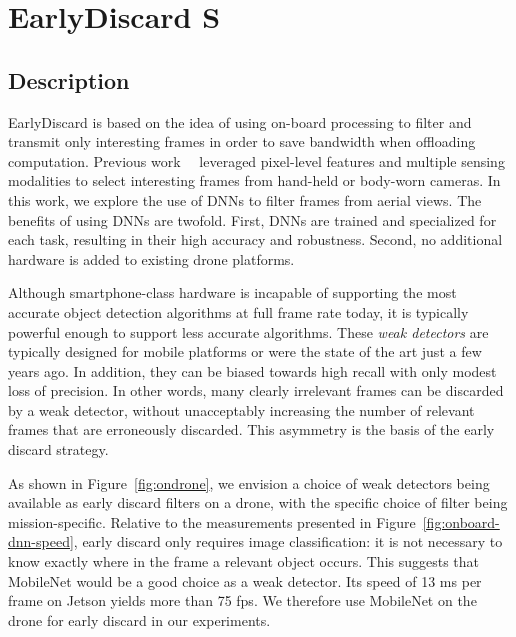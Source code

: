 \section{{\xc EarlyDiscard} S}
\label{sec:earlydiscard}

\subsection{Description}
EarlyDiscard is based on the idea of using on-board processing to filter and
transmit only interesting frames in order to save bandwidth when offloading
computation. Previous work~\cite{Hu2015}~\cite{Naderiparizi2017} leveraged
pixel-level features and multiple sensing modalities to select interesting
frames from hand-held or body-worn cameras. In this work, we explore the use
of DNNs to filter frames from aerial views. The benefits of using DNNs are
twofold. First, DNNs are trained and specialized for each task, resulting in
their high accuracy and robustness. Second, no additional hardware is added to
existing drone platforms.

Although smartphone-class hardware is incapable of supporting the
most accurate object detection algorithms at full frame rate today, it is
typically powerful enough to support less accurate algorithms.  These {\em weak
detectors} are typically designed for mobile platforms or were the state of the
art just a few years ago.  In addition, they can be biased towards high recall
with only modest loss of precision.  In other words, many clearly irrelevant
frames can be discarded by a weak detector, without unacceptably increasing the
number of relevant frames that are erroneously discarded.  This asymmetry is the
basis of the early discard strategy.

As shown in Figure~\ref{fig:ondrone}, we envision a choice of weak detectors
being available as early discard filters on a drone, with the specific choice of
filter being mission-specific.  Relative to the measurements presented in
Figure~\ref{fig:onboard-dnn-speed}, early discard only requires image
classification: it is not necessary to know exactly where in the frame a
relevant object occurs.  This suggests that MobileNet would be a good choice as
a weak detector. Its speed of 13 ms per frame on Jetson yields more than 75 fps.
We therefore use MobileNet on the drone for early discard in our experiments.


